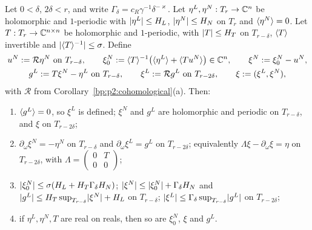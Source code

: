 \begin{lemma}\label{bp:p2:triangular}
Let $0<\delta$, $2\delta<r$, and write $\Gamma_\delta=c_R\gamma^{-1}\delta^{-\varkappa}$. Let
$\eta^L,\eta^N:T_r\to\mathbb{C}^n$ be holomorphic and $1$-periodic with $\lvert \eta^L\rvert\le H_L$,
$\lvert \eta^N\rvert\le H_N$ on $T_r$ and $\langle \eta^N\rangle=0$. Let $T:T_r\to\mathbb{C}^{n\times n}$ be holomorphic and
$1$-periodic, with $\lvert T\rvert\le H_T$ on $T_{r-\delta}$, $\langle T\rangle$ invertible and $\lvert \langle T\rangle^{-1}\rvert\le
\sigma$. Define
\begin{gather*}
u^N:=\mathcal R\eta^N\ \text{on }T_{r-\delta},\qquad
\xi^N_0:=\avg T^{-1}\bigl(\avg{\eta^L}+\avg{Tu^N}\bigr)\in\C^n,\qquad\xi^N:=\xi^N_0-u^N,\\
g^L:=T\xi^N-\eta^L\ \text{on }T_{r-\delta},\qquad\xi^L:=\mathcal Rg^L\ \text{on }T_{r-2\delta},\qquad
\xi:=(\xi^L,\xi^N),
\end{gather*}
with $\mathcal R$ from Corollary~\ref{bp:p2:cohomological}(a). Then:
\begin{enumerate}[label=(\alph*)]
\item $\langle g^L\rangle=0$, so $\xi^L$ is defined; $\xi^N$ and $g^L$ are holomorphic and periodic on
  $T_{r-\delta}$, and $\xi$ on $T_{r-2\delta}$;
\item $\partial_\omega\xi^N=-\eta^N$ on $T_{r-\delta}$ and $\partial_\omega\xi^L=g^L$ on
  $T_{r-2\delta}$; equivalently $\Lambda\xi-\partial_\omega\xi=\eta$ on $T_{r-2\delta}$, with
  $\Lambda=\left(\begin{smallmatrix}0&T\\0&0\end{smallmatrix}\right)$;
\item $\lvert \xi^N_0\rvert\le\sigma(H_L+H_T\Gamma_\delta H_N)$; $\lvert \xi^N\rvert\le\lvert \xi^N_0\rvert+\Gamma_\delta
  H_N$ and $\lvert g^L\rvert\le H_T\sup_{T_{r-\delta}}\lvert \xi^N\rvert+H_L$ on $T_{r-\delta}$;
  $\lvert \xi^L\rvert\le\Gamma_\delta\sup_{T_{r-\delta}}\lvert g^L\rvert$ on $T_{r-2\delta}$;
\item if $\eta^L,\eta^N,T$ are real on reals, then so are $\xi^N_0$, $\xi$ and $g^L$.
\end{enumerate}
\end{lemma}

